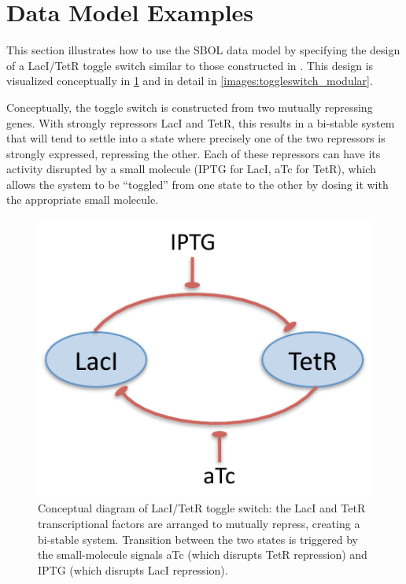 \section{Data Model Examples}
\label{sec:examples}


This section illustrates how to use the SBOL data model by specifying the design of a LacI/TetR toggle switch similar to those constructed in \cite{Gardner2000}. This design is visualized conceptually in \ref{images:toggle} and in detail in \ref{images:toggleswitch_modular}. 

Conceptually, the toggle switch is constructed from two mutually repressing genes.  
With strongly repressors LacI and TetR, this results in a bi-stable system that will tend to settle into a state where precisely one of the two repressors is strongly expressed, repressing the other.
Each of these repressors can have its activity disrupted by a small molecule (IPTG for LacI, aTc for TetR), which allows the system to be ``toggled'' from one state to the other by dosing it with the appropriate small molecule.


\begin{figure}[ht]
\begin{center}
\includegraphics[scale=1.0]{images/toggle-highlevel.pdf}
\caption[]{Conceptual diagram of LacI/TetR toggle switch: the LacI 
  and TetR transcriptional factors are arranged to mutually repress, 
  creating a bi-stable system.  Transition between the two states
  is triggered by the small-molecule signals aTc (which disrupts TetR
  repression) and IPTG (which disrupts LacI repression).}
\label{images:toggle}
\end{center}
\end{figure}

